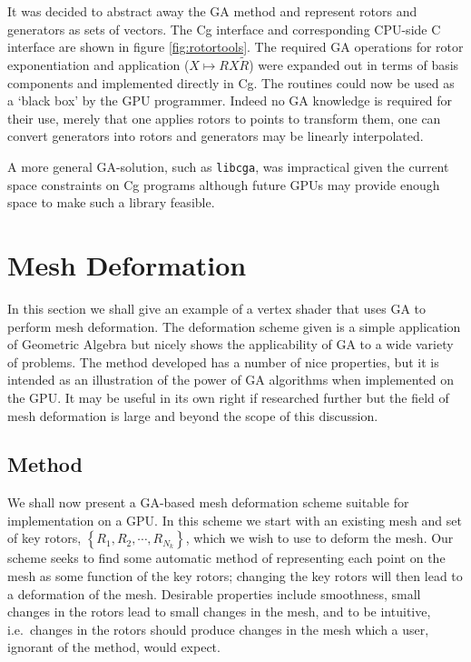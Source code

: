 It was decided to abstract away the GA method and represent rotors and
generators as sets of vectors. The Cg interface and corresponding CPU-side C
interface are shown in figure \ref{fig:rotortools}. The required GA
operations for rotor exponentiation and application ($X \mapsto RX\tilde{R}$)
were expanded out in terms of basis components and implemented
directly in Cg. The routines could now be used as a `black box' by the GPU 
programmer. Indeed no GA knowledge is required for their use, merely that one
applies rotors to points to transform them, one can convert generators into
rotors and generators may be linearly interpolated.

A more general GA-solution, such as {\tt libcga}, was impractical given the
current space constraints on Cg programs although future GPUs may provide
enough space to make such a library feasible.

\section{Mesh Deformation}

In this section we shall give an example of a vertex shader that uses GA to
perform mesh deformation. The deformation scheme given is a
simple application of Geometric Algebra but nicely shows the applicability of
GA to a wide variety of problems. The method developed has a number of nice
properties, but it is intended as an illustration of the power of GA algorithms when
implemented on the GPU. It may be useful in its own right if researched
further but the field of mesh deformation is large and beyond the scope of
this discussion.

\subsection{Method}

We shall now present a GA-based mesh deformation scheme suitable for
implementation on a GPU. In this scheme we start with
an existing mesh and set of key rotors, $\left\{ R_1, R_2, \cdots, R_{N_k} \right\}$,
which we wish to use to deform the mesh. Our scheme seeks to find some automatic
method of representing each point on the mesh as some function of the key
rotors; changing the key rotors will then lead to a deformation of the mesh. Desirable
properties include smoothness, small changes in the rotors lead to small changes
in the mesh, and to be intuitive, i.e.\ changes in the rotors should produce changes
in the mesh which a user, ignorant of the method, would expect.

